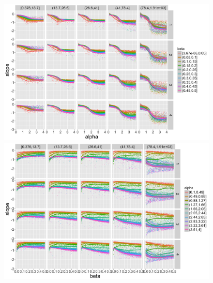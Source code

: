 \begin{figure}
\centering
\includegraphics[width=\textwidth]{figuresraw/slope_alpha}
\includegraphics[width=\textwidth]{figuresraw/slope_beta}
\caption{}
\label{}
\end{figure}



